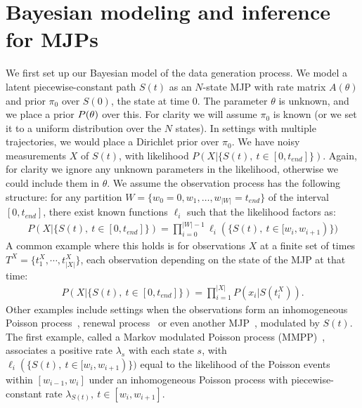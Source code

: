 \section{Bayesian modeling and inference for MJPs}
\label{sec:bayes_model}
We first set up our Bayesian model of the data generation process. 
We model a latent piecewise-constant path $S(t)$ as an $N$-state MJP with rate matrix $A(\theta)$ and prior $\pi_0$ over $S(0)$, the state at time $0$. 
The parameter $\theta$ is unknown, and we place a prior $P(\theta)$ over this. 
For clarity we will assume $\pi_0$ is known (or we set it to a uniform distribution over the $N$ states). 
In settings with multiple trajectories, we would place a Dirichlet prior over $\pi_0$. 
We have noisy measurements $X$ of $S(t)$, with likelihood $P(X|\{S(t),\ t \in [0,t_{end}]\})$.
Again, for clarity we ignore any unknown parameters in the likelihood, otherwise we could include them in $\theta$.
We assume the observation process has the following structure: for any partition $W = \{w_0 = 0, w_1, \dotsc, w_{|W|}=t_{end}\}$ of the interval $[0,t_{end}]$, there exist known functions $\ell_i$ such that the likelihood factors as:
\begin{align}
  \label{eq:lik_factor}
  P(X|\{S(t),\ t \in [0,t_{end}]\}) = \prod_{i=0}^{|W|-1} \ell_i(\{S(t),\ t \in [w_{i},w_{i+1})\})
\end{align}
A common example where this holds is for observations $X$ at a finite set of times $T^X = \{t^X_1,\cdots, t^X_{|X|}\}$, each observation depending on the state of the MJP at that time:
\begin{align}
  \label{eq:lik_iid}
  P(X|\{S(t),\ t \in [0,t_{end}]\}) = \prod_{i=1}^{|X|} P(x_i|S(t^X_i)).
\end{align}
Other examples include settings when the observations form an inhomogeneous Poisson process~\citep{FearnSher2006}, renewal process~\citep{rao2011gaussian} or even another MJP~\citep{Nodelman+al:UAI02,RaoTeh13}, modulated by $S(t)$.
The first example, called a Markov modulated Poisson process (MMPP)~\citep{scottmmpp03}, associates a positive rate $\lambda_s$ with each state $s$, with $\ell_i(\{S(t),\ t \in [w_{i},w_{i+1})\})$ equal to the likelihood of the Poisson events within $[w_{i-1},w_i]$ under an inhomogeneous Poisson process with piecewise-constant rate $\lambda_{S(t)},\ t \in [w_{i},w_{i+1}]$.


